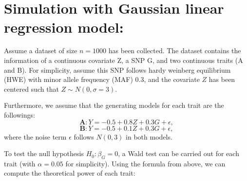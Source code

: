 \documentclass[
]{article}
\begin{document}
\hypertarget{simulation-with-gaussian-linear-regression-model}{%
\section{Simulation with Gaussian linear regression
model:}\label{simulation-with-gaussian-linear-regression-model}}

Assume a dataset of size \(n=1000\) has been collected. The dataset
contains the information of a continuous covariate Z, a SNP G, and two
continuous traits (A and B). For simplicity, assume this SNP follows
hardy weinberg equilibrium (HWE) with minor allele frequency (MAF)
\(0.3\), and the covariate \(Z\) has been centered such that
\(Z\sim N(0,\sigma=3)\).

Furthermore, we assume that the generating models for each trait are the
followings: \[\textbf{A}:Y = -0.5 + 0.8Z + 0.3G + \epsilon,\]
\[\textbf{B}: Y = -0.5 + 0.1Z + 0.3G + \epsilon,\] where the noise term
\(\epsilon\) follows \(N(0,3)\) in both models.

To test the null hypothesis \(H_0: \beta_G = 0\), a Wald test can be
carried out for each trait (with \(\alpha=0.05\) for simplicity). Using
the formula from above, we can compute the theoretical power of each
trait:
\end{document}
